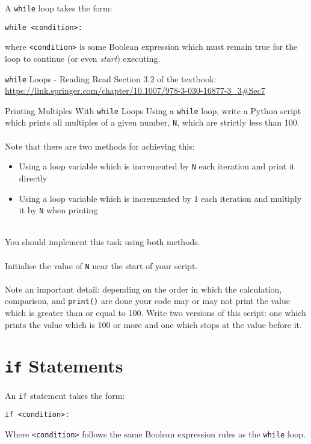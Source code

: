 \documentclass{lab}
\begin{document}
A \texttt{while} loop takes the form:

\texttt{while <condition>:}

where \texttt{<condition>} is some Boolean expression which must remain true for the loop to continue (or even \textit{start}) executing.

\begin{task}{\texttt{while} Loops - Reading}{}
Read Section 3.2 of the textbook: \url{https://link.springer.com/chapter/10.1007/978-3-030-16877-3_3#Sec7}
\end{task}

\begin{task}{Printing Multiples With \texttt{while} Loops}{}
Using a \texttt{while} loop, write a Python script which prints all multiples of a given number, \texttt{N}, which are strictly less than 100.
\\~\\
Note that there are two methods for achieving this:
\\
\begin{itemize}
\item Using a loop variable which is incremented by \texttt{N} each iteration and print it directly
\item Using a loop variable which is incrememted by 1 each iteration and multiply it by \texttt{N} when printing
\end{itemize}
~\\
You should implement this task using both methods.
\\~\\
Initialise the value of \texttt{N} near the start of your script.
\\~\\
Note an important detail: depending on the order in which the calculation, comparison, and \texttt{print()} are done your code may or may not print the value which is greater than or equal to 100. Write two versions of this script: one which prints the value which is 100 or more and one which stops at the value before it.
\end{task}

\pagebreak
\section{\texttt{if} Statements}
An \texttt{if} statement takes the form:

\texttt{if <condition>:}

Where \texttt{<condition>} follows the same Boolean expression rules as the \texttt{while} loop.
\end{document}
